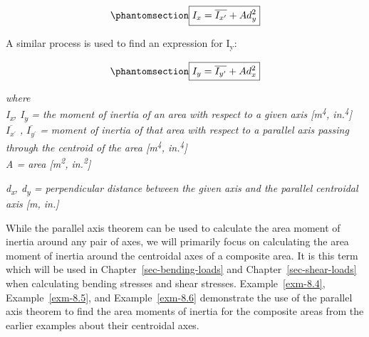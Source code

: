 \documentclass[
  letterpaper,
  DIV=11,
  numbers=noendperiod]{scrreprt}
\theoremstyle{definition}
\theoremstyle{remark}
\begin{document}
\begin{equation}\phantomsection\label{eq-8.3}{
\boxed{I_x=\overline{I_{x^{\prime}}}+A d_y^2}
}\end{equation}

A similar process is used to find an expression for I\textsubscript{y}:

\begin{equation}\phantomsection\label{eq-8.4}{
\boxed{I_y=\overline{I_{y^{\prime}}}+A d_x^2}
}\end{equation}

\emph{where}\\
\emph{I\textsubscript{x}, I\textsubscript{y} = the moment of inertia of
an area with respect to a given axis {[}m\textsuperscript{4},
in.\textsuperscript{4}{]}}\\
\(\overline{I_{x^{\prime}}}\) \emph{,} \(\overline{I_{y^{\prime}}}\)
\emph{= moment of inertia of that area with respect to a parallel axis
passing through the centroid of the area {[}m\textsuperscript{4},
in.\textsuperscript{4}{]}}\\
\emph{A = area {[}m\textsuperscript{2}, in.\textsuperscript{2}{]}}

\emph{d\textsubscript{x}, d\textsubscript{y} = perpendicular distance
between the given axis and the parallel centroidal axis {[}m, in.{]}}

While the parallel axis theorem can be used to calculate the area moment
of inertia around any pair of axes, we will primarily focus on
calculating the area moment of inertia around the centroidal axes of a
composite area. It is this term which will be used in
Chapter~\ref{sec-bending-loads} and Chapter~\ref{sec-shear-loads} when
calculating bending stresses and shear stresses. Example~\ref{exm-8.4},
Example~\ref{exm-8.5}, and Example~\ref{exm-8.6} demonstrate the use of
the parallel axis theorem to find the area moments of inertia for the
composite areas from the earlier examples about their centroidal axes.
\end{document}
